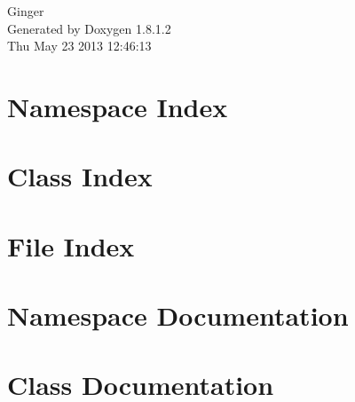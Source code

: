 \documentclass{book}
\begin{document}
\hypersetup{pageanchor=false,citecolor=blue}
\begin{titlepage}
\vspace*{7cm}
\begin{center}
{\Large Ginger }\\
\vspace*{1cm}
{\large Generated by Doxygen 1.8.1.2}\\
\vspace*{0.5cm}
{\small Thu May 23 2013 12:46:13}\\
\end{center}
\end{titlepage}
\clearemptydoublepage
{}
\tableofcontents
\clearemptydoublepage
{}
\hypersetup{pageanchor=true,citecolor=blue}
\chapter{Namespace Index}

\chapter{Class Index}

\chapter{File Index}

\chapter{Namespace Documentation}

\chapter{Class Documentation}





\end{document}
